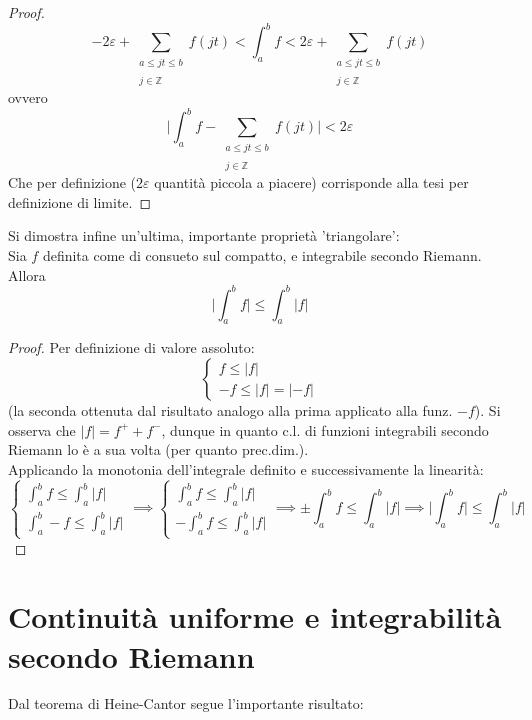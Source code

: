 \documentclass[10pt, oneside]{book}
\theoremstyle{plain}
\begin{document}
\begin{proof}
    \[- 2 \varepsilon + \sum_{\substack{a \leq jt \leq b \\~\\ j \in \mathbb{Z}}} f(jt) < \int_a^b f < 2 \varepsilon + \sum_{\substack{a \leq jt \leq b \\~\\ j \in \mathbb{Z}}} f(jt)\]
    ovvero
    \[\big| \int_a^b f -   \sum_{\substack{a \leq jt \leq b \\~\\ j \in \mathbb{Z}}} f(jt) \big| < 2\varepsilon\]
    Che per definizione ($2\varepsilon$ quantità piccola a piacere) corrisponde alla tesi per definizione di limite.
\end{proof}

Si dimostra infine un'ultima, importante proprietà 'triangolare':
\\Sia $f$ definita come di consueto sul compatto, e integrabile secondo Riemann. Allora
\[\boxed{\big|\int_a^b f\big| \leq \int_a^b |f|}\]
\begin{proof}
    Per definizione di valore assoluto:
    \[\begin{cases}
        f \leq |f| \\
        -f \leq |f| = |-f|        
    \end{cases}\]
    (la seconda ottenuta dal risultato analogo alla prima applicato alla funz. $-f$). Si osserva che $|f| = f^+ + f^-$, dunque in quanto c.l. di funzioni integrabili secondo Riemann lo è a sua volta (per quanto prec.dim.).
    \\Applicando la monotonia dell'integrale definito e successivamente la linearità:
    \[\begin{cases}
        \int_a^b f \leq \int_a^b |f| \\
        \int_a^b -f \leq \int_a^b |f|       
    \end{cases} \implies \begin{cases}
        \int_a^b f \leq \int_a^b |f| \\
        - \int_a^b f \leq \int_a^b |f|       
    \end{cases} \implies \pm  \int_a^b f \leq \int_a^b |f| \implies \big|\int_a^b f\big| \leq \int_a^b |f|\]
\end{proof}

\section{Continuità uniforme e integrabilità secondo Riemann}
Dal teorema di Heine-Cantor segue l'importante risultato:
\end{document}
